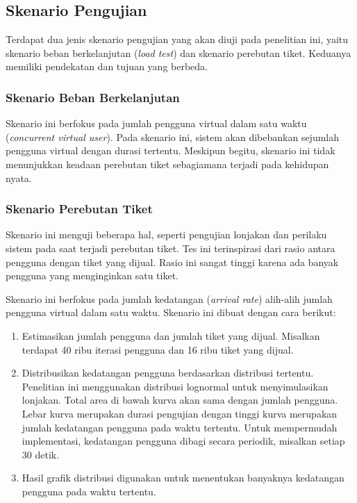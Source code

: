 \subsection{Skenario Pengujian}

Terdapat dua jenis skenario pengujian yang akan diuji pada penelitian ini, yaitu skenario beban berkelanjutan (\textit{load test}) dan skenario perebutan tiket. Keduanya memiliki pendekatan dan tujuan yang berbeda.

\subsubsection{Skenario Beban Berkelanjutan}

Skenario ini berfokus pada jumlah pengguna virtual dalam satu waktu (\textit{concurrent virtual user}). Pada skenario ini, sistem akan dibebankan sejumlah pengguna virtual dengan durasi tertentu. Meskipun begitu, skenario ini tidak menunjukkan keadaan perebutan tiket sebagiamana terjadi pada kehidupan nyata.

\subsubsection{Skenario Perebutan Tiket}

Skenario ini menguji beberapa hal, seperti pengujian lonjakan dan perilaku sistem pada saat terjadi perebutan tiket. Tes ini terinspirasi dari rasio antara pengguna dengan tiket yang dijual. Rasio ini sangat tinggi karena ada banyak pengguna yang menginginkan satu tiket.

Skenario ini berfokus pada jumlah kedatangan (\textit{arrival rate}) alih-alih jumlah pengguna virtual dalam satu waktu. Skenario ini dibuat dengan cara berikut:

\begin{enumerate}
    \item Estimasikan jumlah pengguna dan jumlah tiket yang dijual. Misalkan terdapat 40 ribu iterasi pengguna dan 16 ribu tiket yang dijual.
    \item Distribusikan kedatangan pengguna berdasarkan distribusi tertentu. Penelitian ini menggunakan distribusi lognormal untuk menyimulasikan lonjakan. Total area di bawah kurva akan sama dengan jumlah pengguna. Lebar kurva merupakan durasi pengujian dengan tinggi kurva merupakan jumlah kedatangan pengguna pada waktu tertentu. Untuk mempermudah implementasi, kedatangan pengguna dibagi secara periodik, misalkan setiap 30 detik.
    \item Hasil grafik distribusi digunakan untuk menentukan banyaknya kedatangan pengguna pada waktu tertentu.
\end{enumerate}
